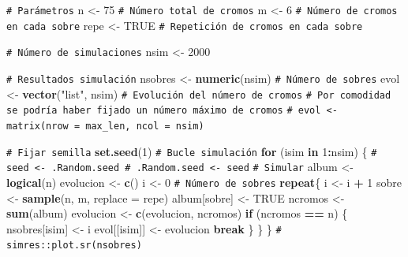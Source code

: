 \documentclass[
  spanish,
  10pt,
]{book}
\newenvironment{Shaded}{\begin{snugshade}}{\end{snugshade}}
\newcommand{\AttributeTok}[1]{\textcolor[rgb]{0.13,0.29,0.53}{#1}}
\newcommand{\CommentTok}[1]{\textcolor[rgb]{0.56,0.35,0.01}{\textit{#1}}}
\newcommand{\ConstantTok}[1]{\textcolor[rgb]{0.56,0.35,0.01}{#1}}
\newcommand{\ControlFlowTok}[1]{\textcolor[rgb]{0.13,0.29,0.53}{\textbf{#1}}}
\newcommand{\DecValTok}[1]{\textcolor[rgb]{0.00,0.00,0.81}{#1}}
\newcommand{\FunctionTok}[1]{\textcolor[rgb]{0.13,0.29,0.53}{\textbf{#1}}}
\newcommand{\NormalTok}[1]{#1}
\newcommand{\OtherTok}[1]{\textcolor[rgb]{0.56,0.35,0.01}{#1}}
\newcommand{\SpecialCharTok}[1]{\textcolor[rgb]{0.81,0.36,0.00}{\textbf{#1}}}
\newcommand{\StringTok}[1]{\textcolor[rgb]{0.31,0.60,0.02}{#1}}
\theoremstyle{break}
\theoremstyle{nonumberplain}
\renewcommand{\CommentTok}[1]{\textcolor[rgb]{0.41,0.41,0.41}{\texttt{#1}}}
\begin{document}
\begin{Shaded}
\begin{Highlighting}[]
\CommentTok{\# Parámetros}
\NormalTok{n }\OtherTok{\textless{}{-}} \DecValTok{75} \CommentTok{\# Número total de cromos}
\NormalTok{m }\OtherTok{\textless{}{-}} \DecValTok{6}  \CommentTok{\# Número de cromos en cada sobre}
\NormalTok{repe }\OtherTok{\textless{}{-}} \ConstantTok{TRUE} \CommentTok{\# Repetición de cromos en cada sobre}

\CommentTok{\# Número de simulaciones}
\NormalTok{nsim }\OtherTok{\textless{}{-}} \DecValTok{2000}

\CommentTok{\# Resultados simulación}
\NormalTok{nsobres }\OtherTok{\textless{}{-}} \FunctionTok{numeric}\NormalTok{(nsim)      }\CommentTok{\# Número de sobres}
\NormalTok{evol }\OtherTok{\textless{}{-}} \FunctionTok{vector}\NormalTok{(}\StringTok{"list"}\NormalTok{, nsim)  }\CommentTok{\# Evolución del número de cromos}
\CommentTok{\# Por comodidad se podría haber fijado un número máximo de cromos}
\CommentTok{\# evol \textless{}{-} matrix(nrow = max\_len, ncol = nsim)}

\CommentTok{\# Fijar semilla}
\FunctionTok{set.seed}\NormalTok{(}\DecValTok{1}\NormalTok{)}
\CommentTok{\# Bucle simulación}
\ControlFlowTok{for}\NormalTok{ (isim }\ControlFlowTok{in} \DecValTok{1}\SpecialCharTok{:}\NormalTok{nsim) \{}
  \CommentTok{\# seed \textless{}{-} .Random.seed \# .Random.seed \textless{}{-} seed}
  \CommentTok{\# Simular}
\NormalTok{  album }\OtherTok{\textless{}{-}} \FunctionTok{logical}\NormalTok{(n)}
\NormalTok{  evolucion }\OtherTok{\textless{}{-}} \FunctionTok{c}\NormalTok{()}
\NormalTok{  i }\OtherTok{\textless{}{-}} \DecValTok{0} \CommentTok{\# Número de sobres}
  \ControlFlowTok{repeat}\NormalTok{\{}
\NormalTok{    i }\OtherTok{\textless{}{-}}\NormalTok{ i }\SpecialCharTok{+} \DecValTok{1}
\NormalTok{    sobre }\OtherTok{\textless{}{-}} \FunctionTok{sample}\NormalTok{(n, m, }\AttributeTok{replace =}\NormalTok{ repe)}
\NormalTok{    album[sobre] }\OtherTok{\textless{}{-}} \ConstantTok{TRUE}
\NormalTok{    ncromos }\OtherTok{\textless{}{-}} \FunctionTok{sum}\NormalTok{(album)}
\NormalTok{    evolucion }\OtherTok{\textless{}{-}} \FunctionTok{c}\NormalTok{(evolucion, ncromos)}
    \ControlFlowTok{if}\NormalTok{ (ncromos }\SpecialCharTok{==}\NormalTok{ n) \{}
\NormalTok{      nsobres[isim] }\OtherTok{\textless{}{-}}\NormalTok{ i}
\NormalTok{      evol[[isim]] }\OtherTok{\textless{}{-}}\NormalTok{ evolucion}
      \ControlFlowTok{break}
\NormalTok{    \}}
\NormalTok{  \}}
\NormalTok{\}}
\CommentTok{\# simres::plot.sr(nsobres)}
\end{Highlighting}
\end{Shaded}
\end{document}
